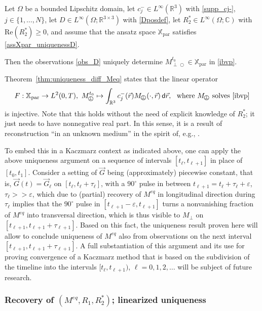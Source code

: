 \documentclass{ws-m3as}
\renewcommand\Re{\mathrm{Re}}
\def\Mpp{M_{\perp\!\!\!\!\!\bigcirc}}
\newcommand\Xpar{\mathbb{X}_{\text{par}}}
\newcommand\taup{\varepsilon}
\newcommand{\revisionown}[1]{{ #1}}
\begin{document}
\begin{theorem}
\label{thm:uniqueness_diff_Meq}
Let $\Omega$ be a bounded Lipschitz domain, 
let $c_j^-\in L^\infty(\mathbb{R}^3)$ with \eqref{supp_cj-}, $j\in\{1,\ldots,N\}$, 
let $D\in L^\infty(\Omega;\mathbb{R}^{3\times3})$ with \eqref{Dposdef},
let $R_2^*\in L^\infty(\Omega;\mathbb{C})$ with $\Re(R_2^*)\geq0$, 
and assume that the ansatz space $\Xpar$ satisfies \eqref{assXpar_uniquenessD}. 

Then the observations \eqref{obs_D} uniquely determine $\Mpp^{t_0}\in\Xpar$ in \eqref{ibvp}. 
\end{theorem}

Theorem~\ref{thm:uniqueness_diff_Meq} states that the linear operator 
\[
F:\Xpar\to L^2(0,T), \ \Mpp^{t_0}\mapsto \int_{\mathbb{R}^3} c^-_j(\vec r) \Mpp(\cdot, \vec r) \,\textsf{d}\vec r,\ \text{ where $\Mpp$ solves \eqref{ibvp}}
\]
is injective.
Note that this holds without the need of explicit knowledge of $R_2^*$; it just needs to have nonnegative real part.
In this sense, it is a result of reconstruction ``in an unknown medium'' in the spirit of, e.g., \cite{JinKian:2023}.

\begin{remark}\label{Kaczmarz90deg}
To embed this in a Kaczmarz context as indicated above, one can apply the above uniqueness argument on a sequence of intervals $[t_\ell,t_{\ell+1}]$ in place of $[t_0,t_1]$.
Consider a setting of $\vec G$ being (approximately) piecewise constant, that is, $\vec G(t)=\vec G_\ell$ on $[t_\ell,t_\ell+\tau_\ell]$, with a $90^\circ$ pulse in between $t_{\ell+1}= t_\ell+\tau_\ell+\taup$, $\tau_\ell>>\taup$, which due to (partial) recovery of $M^{eq}$ in longitudinal direction during $\tau_\ell$ implies that the $90^\circ$ pulse in $[t_{\ell+1}-\taup,t_{\ell+1}]$ turns a nonvanishing  fraction of $M^{eq}$ into transversal direction, which is thus visible to $M_\perp$ on $[t_{\ell+1},t_{\ell+1}+\tau_{\ell+1}]$.
Based on this fact, the uniqueness result proven here will allow to conclude uniqueness of $M^{eq}$ also from observations on the next interval $[t_{\ell+1},t_{\ell+1}+\tau_{\ell+1}]$.
A full substantiation of this argument and its use for proving convergence of a Kaczmarz method that is based on the subdivision of the timeline into the intervals $[t_\ell,t_{\ell+1})$, $\ell=0,1,2,\ldots$ will be subject of future research.
\end{remark}

\subsubsection{Recovery of $(M^{eq},R_1,R_2^*)$; linearized uniqueness}
\end{document}
